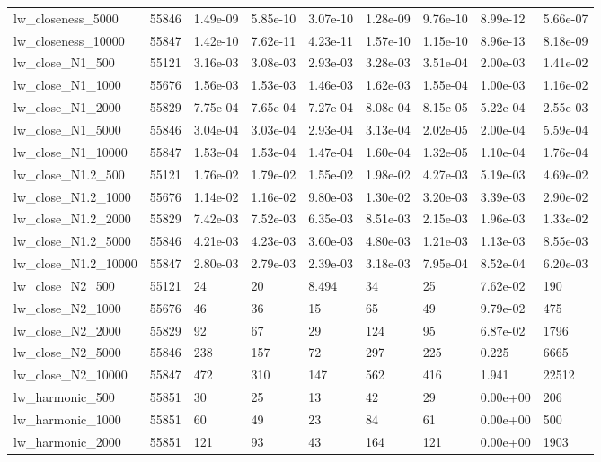 \begin{tabular}{lrlllllll}
lw\_closeness\_5000 & 55846 & 1.49e-09 & 5.85e-10 & 3.07e-10 & 1.28e-09 & 9.76e-10 & 8.99e-12 & 5.66e-07 \\
lw\_closeness\_10000 & 55847 & 1.42e-10 & 7.62e-11 & 4.23e-11 & 1.57e-10 & 1.15e-10 & 8.96e-13 & 8.18e-09 \\
lw\_close\_N1\_500 & 55121 & 3.16e-03 & 3.08e-03 & 2.93e-03 & 3.28e-03 & 3.51e-04 & 2.00e-03 & 1.41e-02 \\
lw\_close\_N1\_1000 & 55676 & 1.56e-03 & 1.53e-03 & 1.46e-03 & 1.62e-03 & 1.55e-04 & 1.00e-03 & 1.16e-02 \\
lw\_close\_N1\_2000 & 55829 & 7.75e-04 & 7.65e-04 & 7.27e-04 & 8.08e-04 & 8.15e-05 & 5.22e-04 & 2.55e-03 \\
lw\_close\_N1\_5000 & 55846 & 3.04e-04 & 3.03e-04 & 2.93e-04 & 3.13e-04 & 2.02e-05 & 2.00e-04 & 5.59e-04 \\
lw\_close\_N1\_10000 & 55847 & 1.53e-04 & 1.53e-04 & 1.47e-04 & 1.60e-04 & 1.32e-05 & 1.10e-04 & 1.76e-04 \\
lw\_close\_N1.2\_500 & 55121 & 1.76e-02 & 1.79e-02 & 1.55e-02 & 1.98e-02 & 4.27e-03 & 5.19e-03 & 4.69e-02 \\
lw\_close\_N1.2\_1000 & 55676 & 1.14e-02 & 1.16e-02 & 9.80e-03 & 1.30e-02 & 3.20e-03 & 3.39e-03 & 2.90e-02 \\
lw\_close\_N1.2\_2000 & 55829 & 7.42e-03 & 7.52e-03 & 6.35e-03 & 8.51e-03 & 2.15e-03 & 1.96e-03 & 1.33e-02 \\
lw\_close\_N1.2\_5000 & 55846 & 4.21e-03 & 4.23e-03 & 3.60e-03 & 4.80e-03 & 1.21e-03 & 1.13e-03 & 8.55e-03 \\
lw\_close\_N1.2\_10000 & 55847 & 2.80e-03 & 2.79e-03 & 2.39e-03 & 3.18e-03 & 7.95e-04 & 8.52e-04 & 6.20e-03 \\
lw\_close\_N2\_500 & 55121 & 24 & 20 & 8.494 & 34 & 25 & 7.62e-02 & 190 \\
lw\_close\_N2\_1000 & 55676 & 46 & 36 & 15 & 65 & 49 & 9.79e-02 & 475 \\
lw\_close\_N2\_2000 & 55829 & 92 & 67 & 29 & 124 & 95 & 6.87e-02 & 1796 \\
lw\_close\_N2\_5000 & 55846 & 238 & 157 & 72 & 297 & 225 & 0.225 & 6665 \\
lw\_close\_N2\_10000 & 55847 & 472 & 310 & 147 & 562 & 416 & 1.941 & 22512 \\
lw\_harmonic\_500 & 55851 & 30 & 25 & 13 & 42 & 29 & 0.00e+00 & 206 \\
lw\_harmonic\_1000 & 55851 & 60 & 49 & 23 & 84 & 61 & 0.00e+00 & 500 \\
lw\_harmonic\_2000 & 55851 & 121 & 93 & 43 & 164 & 121 & 0.00e+00 & 1903 \\

\end{tabular}
